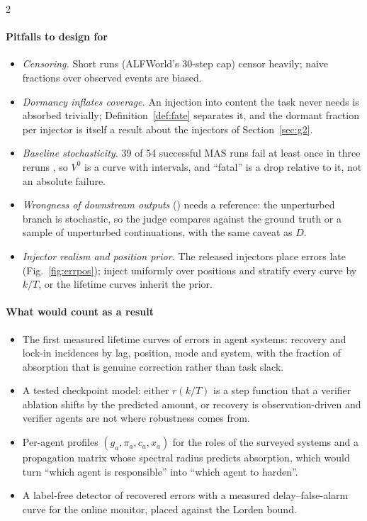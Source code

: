 \begin{multicols}{2}
\paragraph{Pitfalls to design for}
\begin{itemize}[leftmargin=1.1em]
\item \emph{Censoring.} Short runs (ALFWorld's 30-step cap) censor heavily; naive fractions over observed events are biased.
\item \emph{Dormancy inflates coverage.} An injection into content the task never needs is absorbed trivially; Definition~\ref{def:fate} separates it, and the dormant fraction per injector is itself a result about the injectors of Section~\ref{sec:g2}.
\item \emph{Baseline stochasticity.} 39 of 54 successful MAS runs fail at least once in three reruns \cite{luan2026symtrace}, so $V^0$ is a curve with intervals, and ``fatal'' is a drop relative to it, not an absolute failure.
\item \emph{Wrongness of downstream outputs} () needs a reference: the unperturbed branch is stochastic, so the judge compares against the ground truth or a sample of unperturbed continuations, with the same caveat as $D$.
\item \emph{Injector realism and position prior.} The released injectors place errors late (Fig.~\ref{fig:errpos}); inject uniformly over positions and stratify every curve by $k/T$, or the lifetime curves inherit the prior.
\end{itemize}

\paragraph{What would count as a result}
\begin{itemize}[leftmargin=1.1em]
\item The first measured lifetime curves of errors in agent systems: recovery and lock-in incidences by lag, position, mode and system, with the fraction of absorption that is genuine correction rather than task slack.
\item A tested checkpoint model: either $r(k/T)$ is a step function that a verifier ablation shifts by the predicted amount, or recovery is observation-driven and verifier agents are not where robustness comes from.
\item Per-agent profiles $(g_a,\pi_a,c_a,x_a)$ for the roles of the surveyed systems and a propagation matrix whose spectral radius predicts absorption, which would turn ``which agent is responsible'' into ``which agent to harden''.
\item A label-free detector of recovered errors with a measured delay--false-alarm curve for the online monitor, placed against the Lorden bound.
\end{itemize}
\end{multicols}
